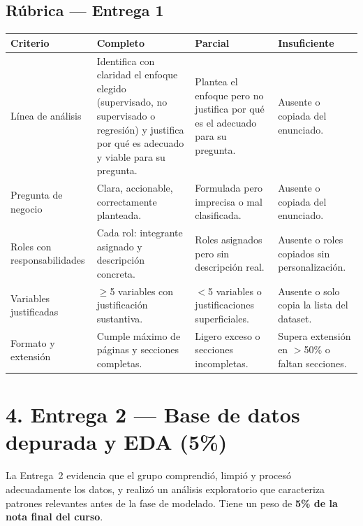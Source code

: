 \documentclass[11pt,letterpaper]{article}
\begin{document}
\subsection{Rúbrica --- Entrega 1}
\begin{tabular}{L{3.2cm} L{3.4cm} L{3.4cm} L{4.2cm}}
  \toprule
  \textbf{Criterio} & \textbf{Completo} & \textbf{Parcial} & \textbf{Insuficiente} \\
  \midrule
  Línea de análisis
    & Identifica con claridad el enfoque elegido (supervisado, no supervisado o regresión) y justifica por qué es adecuado y viable para su pregunta.
    & Plantea el enfoque pero no justifica por qué es el adecuado para su pregunta.
    & Ausente o copiada del enunciado. \\
  \addlinespace
  Pregunta de negocio
    & Clara, accionable, correctamente planteada.
    & Formulada pero imprecisa o mal clasificada.
    & Ausente o copiada del enunciado. \\
  \addlinespace
  Roles con responsabilidades
    & Cada rol: integrante asignado y descripción concreta.
    & Roles asignados pero sin descripción real.
    & Ausente o roles copiados sin personalización. \\
  \addlinespace
  Variables justificadas
    & $\geq$5 variables con justificación sustantiva.
    & $<$5 variables o justificaciones superficiales.
    & Ausente o solo copia la lista del dataset. \\
  \addlinespace
  Formato y extensión
    & Cumple máximo de páginas y secciones completas.
    & Ligero exceso o secciones incompletas.
    & Supera extensión en $>$50\% o faltan secciones. \\
  \bottomrule
\end{tabular}

\clearpage
\section{4. Entrega 2 --- Base de datos depurada y EDA (5\%)}

La Entrega~2 evidencia que el grupo comprendió, limpió y procesó adecuadamente los datos, y realizó un análisis exploratorio que caracteriza patrones relevantes antes de la fase de modelado. Tiene un peso de \textbf{5\% de la nota final del curso}.
\end{document}
